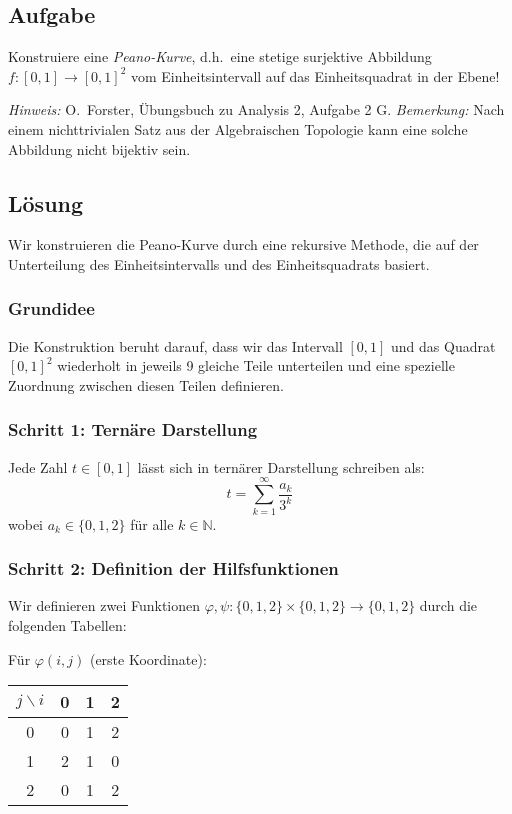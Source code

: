 \documentclass{article}
\begin{document}
\subsection*{Aufgabe}
Konstruiere eine \textit{Peano-Kurve}, d.h.~eine stetige surjektive
Abbildung $f:[0,1]\to[0,1]^2$ vom Einheitsintervall auf das
Einheitsquadrat in der Ebene! 

\textit{Hinweis:} O.~Forster, Übungsbuch zu Analysis 2, Aufgabe 2 G. 
\textit{Bemerkung:} Nach einem nichttrivialen Satz aus der Algebraischen Topologie kann eine
solche Abbildung nicht bijektiv sein. 

\subsection*{Lösung}

Wir konstruieren die Peano-Kurve durch eine rekursive Methode, die auf der Unterteilung des Einheitsintervalls und des Einheitsquadrats basiert.

\subsubsection*{Grundidee}

Die Konstruktion beruht darauf, dass wir das Intervall $[0,1]$ und das Quadrat $[0,1]^2$ wiederholt in jeweils 9 gleiche Teile unterteilen und eine spezielle Zuordnung zwischen diesen Teilen definieren.

\subsubsection*{Schritt 1: Ternäre Darstellung}

Jede Zahl $t \in [0,1]$ lässt sich in ternärer Darstellung schreiben als:
$$t = \sum_{k=1}^{\infty} \frac{a_k}{3^k}$$
wobei $a_k \in \{0, 1, 2\}$ für alle $k \in \mathbb{N}$.

\subsubsection*{Schritt 2: Definition der Hilfsfunktionen}

Wir definieren zwei Funktionen $\varphi, \psi: \{0,1,2\} \times \{0,1,2\} \to \{0,1,2\}$ durch die folgenden Tabellen:

Für $\varphi(i,j)$ (erste Koordinate):
\begin{center}
\begin{tabular}{c|ccc}
$j \backslash i$ & 0 & 1 & 2 \\
\hline
0 & 0 & 1 & 2 \\
1 & 2 & 1 & 0 \\
2 & 0 & 1 & 2 \\
\end{tabular}
\end{center}
\end{document}
